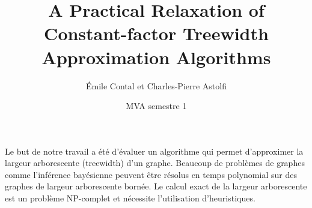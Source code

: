\documentclass[handout]{beamer}
\title{A Practical Relaxation of Constant-factor Treewidth
        Approximation Algorithms}
\author{Émile Contal et Charles-Pierre Astolfi}
\date{MVA semestre 1}
\begin{document}
\begin{frame}
  \maketitle
  \begin{block}
    \centering
    Le but de notre travail a été d'évaluer un algorithme qui permet
    d'approximer la largeur arborescente (treewidth) d'un graphe.
    Beaucoup de problèmes de graphes comme l'inférence bayésienne peuvent
    être résolus en temps polynomial sur des graphes de largeur
    arborescente bornée. 
    \cite{bayesian_inferance} %
    Le calcul exact de la largeur arborescente est un
    problème NP-complet et nécessite l'utilisation d'heuristiques.
  \end{block}
\end{frame}
\end{document}
